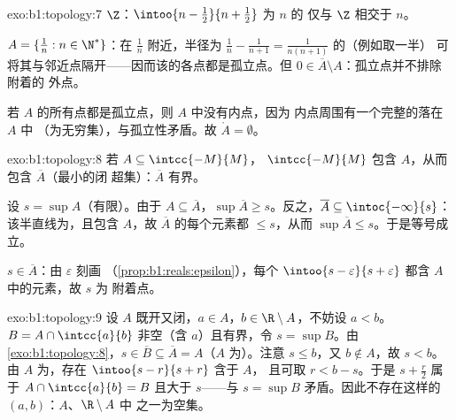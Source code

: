 \begin{solution}{exo:b1:topology:7}
$\Z$：$\intoo{n - \frac12}{n + \frac12}$ 为 $n$ 的
仅与 $\Z$ 相交于 $n$。

$A = \{\frac1n : n \in \N^*\}$：在 $\frac 1n$ 附近，半径为
$\frac{1}{n} - \frac{1}{n+1} = \frac{1}{n(n+1)}$ 的（例如取一半）
可将其与邻近点隔开——因而该的各点都是孤立点。但 $0 \in
\overline A \setminus A$：孤立点并不排除附着的
外点。

若 $A$ 的所有点都是孤立点，则 $A$ 中没有内点，因为
内点周围有一个完整的落在 $A$ 中
（为无穷集），与孤立性矛盾。故 $\mathring A
= \emptyset$。
\end{solution}

\begin{solution}{exo:b1:topology:8}
若 $A \subseteq \intcc{-M}{M}$， $\intcc{-M}{M}$
包含 $A$，从而包含 $\overline A$（最小的闭
超集）：$\overline A$ 有界。

设 $s = \sup A$（有限）。由于 $A \subseteq \overline A$，$\sup
\overline A \geq s$。反之，$\overline A \subseteq
\intoc{-\infty}{s}$：该半直线为，且包含 $A$，故
$\overline A$ 的每个元素都 $\leq s$，从而 $\sup\overline A
\leq s$。于是等号成立。

$s \in \overline A$：由 $\varepsilon$ 刻画
（\cref{prop:b1:reals:epsilon}），每个 $\intoo{s -
\varepsilon}{s + \varepsilon}$ 都含 $A$ 中的元素，故 $s$ 为
附着点。
\end{solution}

\begin{solution}{exo:b1:topology:9}
设 $A$ 既开又闭，$a \in A$，$b \in \R
\setminus A$，不妨设 $a < b$。 $B = A \cap
\intcc{a}{b}$ 非空（含 $a$）且有界，令 $s = \sup B$。由
\cref{exo:b1:topology:8}，$s \in \overline B \subseteq \overline A =
A$（$A$ 为）。注意 $s \leq b$，又 $b \notin A$，故 $s < b$。
由 $A$ 为，存在 $\intoo{s - r}{s + r}$ 含于 $A$，
且可取 $r < b - s$。于是 $s + \frac{r}{2}$ 属于 $A
\cap \intcc{a}{b} = B$ 且大于 $s$——与 $s = \sup
B$ 矛盾。因此不存在这样的 $(a, b)$：$A$、$\R \setminus A$ 中
之一为空集。
\end{solution}

